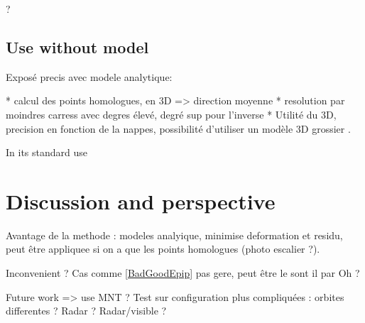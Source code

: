 \documentclass{ipol}
\begin{document}
? 


\subsection{Use without model}


Exposé precis avec modele analytique:

    * calcul des points homologues, en 3D => direction moyenne
    * resolution par moindres carress avec degres élevé, degré sup pour l'inverse
    * Utilité du 3D, precision en fonction de la nappes, possibilité d'utiliser un modèle 3D grossier .

In its standard use
    

\section{Discussion and perspective}

Avantage de la methode : modeles analyique, minimise deformation et residu, peut être appliquee 
si on a que les points homologues (photo escalier ?).

Inconvenient ? Cas comme \ref{BadGoodEpip} pas gere, peut être le sont il par Oh ?

Future work => use MNT ? Test sur configuration plus compliquées : orbites differentes ? Radar ? Radar/visible ?









\end{document}
